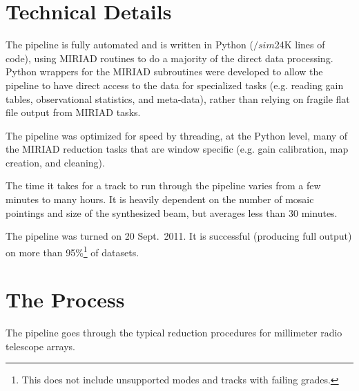 \section{Technical Details}

The pipeline is fully automated and is written in Python ($/sim$24K lines of code), using MIRIAD \citep{stw95} routines to do a majority of the direct data processing. Python wrappers for the MIRIAD subroutines were developed to allow the pipeline to have direct access to the data for specialized tasks (e.g. reading gain tables, observational statistics, and meta-data), rather than relying on fragile flat file output from MIRIAD tasks.

The pipeline was optimized for speed by threading, at the Python level, many of the MIRIAD reduction tasks that are window specific (e.g. gain calibration, map creation, and cleaning).

The time it takes for a track to run through the pipeline varies from a few minutes to many hours. It is heavily dependent on the number of mosaic pointings and size of the synthesized beam, but averages less than 30 minutes.

The pipeline was turned on 20 Sept.\ 2011. It is successful (producing full output) on more than 95\%\footnote{This does not include unsupported modes and tracks with failing grades.} of datasets.

\section{The Process}

The pipeline goes through the typical reduction procedures for millimeter radio telescope arrays.

